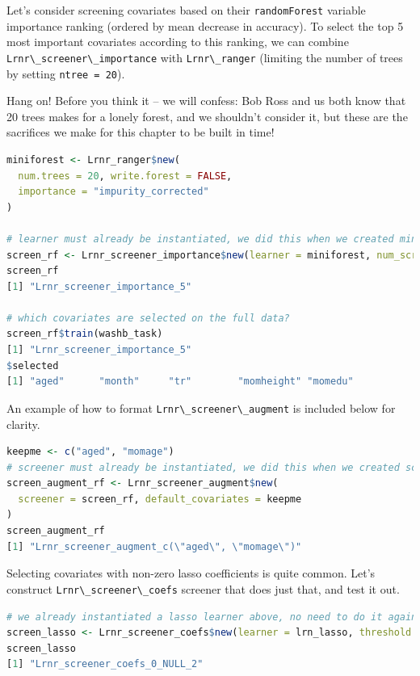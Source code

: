 \documentclass[
  12pt, krantz2,
]{krantz}
\newcommand{\passthrough}[1]{#1}
\theoremstyle{definition}
\theoremstyle{definition}
\theoremstyle{definition}
\newcommand{\1}{\mathbbm{1}}
\begin{document}
Let's consider screening covariates based on their \passthrough{\lstinline!randomForest!} variable
importance ranking (ordered by mean decrease in accuracy). To select the top
5 most important covariates according to this ranking, we can combine
\passthrough{\lstinline!Lrnr\_screener\_importance!} with \passthrough{\lstinline!Lrnr\_ranger!} (limiting the number of trees by
setting \passthrough{\lstinline!ntree = 20!}).

Hang on! Before you think it -- we will confess: Bob Ross and us both know that
20 trees makes for a lonely forest, and we shouldn't consider it, but these are
the sacrifices we make for this chapter to be built in time!

\begin{lstlisting}[language=R]
miniforest <- Lrnr_ranger$new(
  num.trees = 20, write.forest = FALSE,
  importance = "impurity_corrected"
)

# learner must already be instantiated, we did this when we created miniforest
screen_rf <- Lrnr_screener_importance$new(learner = miniforest, num_screen = 5)
screen_rf
[1] "Lrnr_screener_importance_5"

# which covariates are selected on the full data?
screen_rf$train(washb_task)
[1] "Lrnr_screener_importance_5"
$selected
[1] "aged"      "month"     "tr"        "momheight" "momedu"   
\end{lstlisting}

An example of how to format \passthrough{\lstinline!Lrnr\_screener\_augment!} is included below for
clarity.

\begin{lstlisting}[language=R]
keepme <- c("aged", "momage")
# screener must already be instantiated, we did this when we created screen_rf
screen_augment_rf <- Lrnr_screener_augment$new(
  screener = screen_rf, default_covariates = keepme
)
screen_augment_rf
[1] "Lrnr_screener_augment_c(\"aged\", \"momage\")"
\end{lstlisting}

Selecting covariates with non-zero lasso coefficients is quite common. Let's
construct \passthrough{\lstinline!Lrnr\_screener\_coefs!} screener that does just that, and test it
out.

\begin{lstlisting}[language=R]
# we already instantiated a lasso learner above, no need to do it again
screen_lasso <- Lrnr_screener_coefs$new(learner = lrn_lasso, threshold = 0)
screen_lasso
[1] "Lrnr_screener_coefs_0_NULL_2"
\end{lstlisting}
\end{document}
